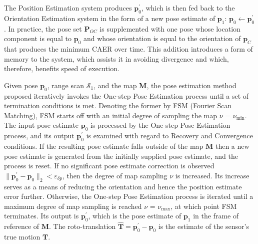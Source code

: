 The Position Estimation system produces $\bm{p}_0^\prime$, which is then fed
back to the Orientation Estimation system in the form of a new pose estimate
of $\bm{p}_1$: $\bm{p}_0 \leftarrow \bm{p}_0^\prime$. In practice, the pose set
$\bm{P}_{OC}$ is supplemented with one pose whose location component is equal
to $\bm{p}_0$ and whose orientation is equal to the orientation of $\bm{p}_C$
that produces the minimum CAER over time. This addition introduces a form of
memory to the system, which assists it in avoiding divergence and which,
therefore, benefits speed of execution.


Given pose $\bm{p}_0$, range scan $\mathcal{S}_1$, and the map $\bm{M}$, the
pose estimation method proposed iteratively invokes the One-step Pose
Estimation process until a set of termination conditions is met. Denoting the
former by FSM (Fourier Scan Matching), FSM starts off with an initial degree of
sampling the map $\nu$ = $\nu_{\min}$. The input pose estimate  $\bm{p}_0$ is
processed by the One-step Pose Estimation process, and its output
$\bm{p}_0^\prime$ is examined with regard to Recovery and Convergence
conditions. If the resulting pose estimate falls outside of the map $\bm{M}$
then a new pose estimate is generated from the initially supplied pose
estimate, and the process is reset.  If no significant pose estimate correction
is observed $\|\bm{p}_0^\prime-\bm{p}_0\|_2 < \varepsilon_{\delta p}$, then the
degree of map sampling $\nu$ is increased.  Its increase serves as a means of
reducing the orientation and hence the position estimate error further.
Otherwise, the One-step Pose Estimation process is iterated until a maximum
degree of map sampling is reached $\nu$ = $\nu_{\max}$, at which point FSM
terminates. Its output is $\bm{p}_0^\prime$, which is the pose estimate of
$\bm{p}_1$ in the frame of reference of $\bm{M}$. The roto-translation
$\hat{\bm{T}} = \bm{p}_0^\prime - \bm{p}_0$ is the estimate of the sensor's
true motion $\bm{T}$.
